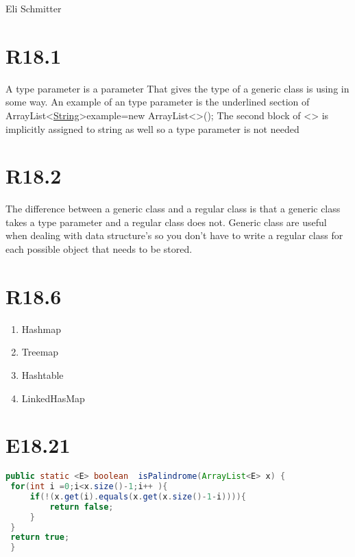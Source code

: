 \documentclass{article}
\begin{document}
\begin{flushleft}
 Eli Schmitter\\
\end{flushleft}
\section{R18.1}
A type parameter is a parameter That gives the type of a generic class is using in some way. An example of an type parameter is the underlined section of ArrayList\textless\underline{String}\textgreater example=new ArrayList\textless\textgreater(); The second block of <> is implicitly  assigned to string as well so a type parameter is not needed
\section{R18.2}
The difference between a generic class and a regular class is that a generic class takes a type parameter and a regular class does not. Generic class are useful when dealing with data structure's so you don't have to write a  regular class for each possible object that needs to be stored.
\section{R18.6}
\begin{enumerate}
  \item Hashmap
  \item Treemap
  \item Hashtable
  \item LinkedHasMap
\end{enumerate}
\section{E18.21}
\begin{lstlisting}[language=Java]
public static <E> boolean  isPalindrome(ArrayList<E> x) {
 for(int i =0;i<x.size()-1;i++ ){
     if(!(x.get(i).equals(x.get(x.size()-1-i)))){
         return false;
     }
 }
 return true;
 }

 \end{lstlisting}
\end{document}
